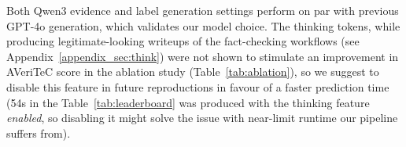 Both Qwen3 evidence and label generation settings perform on par with previous GPT-4o generation, which validates our model choice.
The thinking tokens, while producing legitimate-looking writeups of the fact-checking workflows (see Appendix~\ref{appendix_sec:think}) were not shown to stimulate an improvement in AVeriTeC score in the ablation study (Table~\ref{tab:ablation}), so we suggest to disable this feature in future reproductions in favour of a faster prediction time (54s in the Table~\ref{tab:leaderboard} was produced with the thinking feature \textit{enabled}, so disabling it might solve the issue with near-limit runtime our pipeline suffers from). 